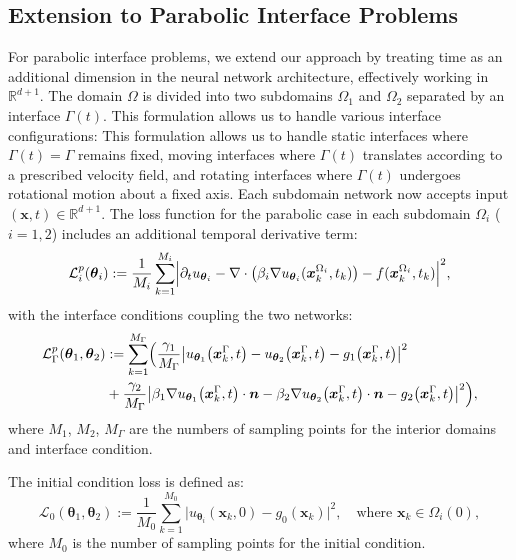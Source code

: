 \documentclass{article}
\begin{document}
\subsection{Extension to Parabolic Interface Problems}
For parabolic interface problems, we extend our approach by treating time as an additional dimension in the neural network architecture, effectively working in $\mathbb{R}^{d+1}$. The domain $\Omega$ is divided into two subdomains $\Omega_1$ and $\Omega_2$ separated by an interface $\Gamma(t)$. This formulation allows us to handle various interface configurations:
This formulation allows us to handle static interfaces where $\Gamma(t) = \Gamma$ remains fixed, moving interfaces where $\Gamma(t)$ translates according to a prescribed velocity field, and rotating interfaces where $\Gamma(t)$ undergoes rotational motion about a fixed axis.
Each subdomain network now accepts input $(\mathbf{x}, t) \in \mathbb{R}^{d+1}$. The loss function for the parabolic case in each subdomain $\Omega_i$ ($i=1,2$) includes an additional temporal derivative term:
\begin{equation}
\mathcal{L}_i^p(\boldsymbol{\theta}_i) := \frac{1}{M_i} \sum_{k=1}^{M_i}
\Bigl|\partial_t u_{\boldsymbol{\theta}_i} - \nabla \cdot \bigl(\beta_i \nabla u_{\boldsymbol{\theta}_i}(\boldsymbol{x}_k^{\Omega_i}, t_k)\bigr)
- f(\boldsymbol{x}_k^{\Omega_i}, t_k)\Bigr|^2,
\end{equation}
with the interface conditions coupling the two networks:
\begin{equation}
\begin{aligned}
    \mathcal{L}_{\Gamma}^p(\boldsymbol{\theta}_1, \boldsymbol{\theta}_2) &:= \sum_{k=1}^{M_{\Gamma}}
\Bigl(\frac{\gamma_1}{M_{\Gamma}} \bigl|u_{\boldsymbol{\theta}_1}\bigl(\boldsymbol{x}_k^{\Gamma}, t\bigr) - u_{\boldsymbol{\theta}_2}\bigl(\boldsymbol{x}_k^{\Gamma}, t\bigr)
- g_1\bigl(\boldsymbol{x}_k^{\Gamma}, t\bigr)\bigr|^2 \\
&+ \frac{\gamma_2}{M_{\Gamma}}\bigl|\beta_1 \nabla u_{\boldsymbol{\theta}_1}\bigl(\boldsymbol{x}_k^{\Gamma}, t\bigr) \cdot \boldsymbol{n} - \beta_2 \nabla u_{\boldsymbol{\theta}_2}\bigl(\boldsymbol{x}_k^{\Gamma}, t\bigr) \cdot \boldsymbol{n}
- g_2\bigl(\boldsymbol{x}_k^{\Gamma}, t\bigr)\bigr|^2\Bigr),
\end{aligned}
\end{equation}
where $M_1$, $M_2$, $M_{\Gamma}$ are the numbers of sampling points for the interior domains and interface condition.

The initial condition loss is defined as:
\begin{equation}
\mathcal{L}_0(\boldsymbol{\theta}_1, \boldsymbol{\theta}_2) := \frac{1}{M_0} \sum_{k=1}^{M_0}
\bigl|u_{\boldsymbol{\theta}_i}(\boldsymbol{x}_k, 0) - g_0(\boldsymbol{x}_k)\bigr|^2, \quad \text{where } \boldsymbol{x}_k \in \Omega_i(0),
\end{equation}
where $M_0$ is the number of sampling points for the initial condition.
\end{document}
